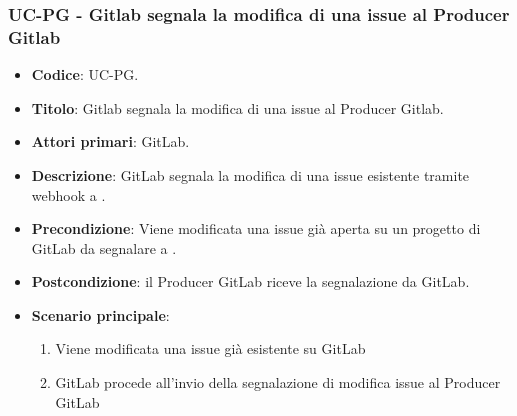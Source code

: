 	\subsubsection{UC\theuccount-PG - Gitlab segnala la modifica di una issue al Producer Gitlab}
	\begin{itemize}
		\item \textbf{Codice}: UC\theuccount-PG.
		\item \textbf{Titolo}: Gitlab segnala la modifica di una issue al Producer Gitlab.
		\item \textbf{Attori primari}: GitLab.
		\item \textbf{Descrizione}: GitLab segnala la modifica di una issue esistente tramite webhook a
		\newline \progetto.
		\item \textbf{Precondizione}: Viene modificata una issue già aperta su un
		progetto di GitLab da segnalare a \progetto.
		\item \textbf{Postcondizione}: il Producer GitLab riceve la segnalazione da GitLab.
		\item \textbf{Scenario principale}: 
		\begin{enumerate}
			\item Viene modificata una issue già esistente su GitLab
			\item GitLab procede all'invio della segnalazione di modifica issue al Producer GitLab
		\end{enumerate}
		
	\end{itemize}